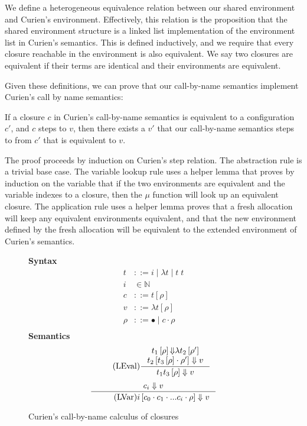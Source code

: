We define a heterogeneous equivalence relation between our shared environment
and Curien's environment. Effectively, this relation is the proposition that
the shared environment structure is a linked list implementation of the
environment list in Curien's semantics. This is defined inductively, and we
require that every closure reachable in the environment is also equivalent.  We
say two closures are equivalent if their terms are identical and their
environments are equivalent. 

Given these definitions, we can prove that our call-by-name semantics implement
Curien's call by name semantics: 

\begin{theorem}
If a closure $c$ in Curien's call-by-name semantics is equivalent to a
configuration $c'$, and $c$ steps to $v$, then there exists a $v'$ that our
call-by-name semantics steps to from $c'$ that is equivalent to $v$.
\end{theorem}
\begin{proofoutline}
The proof proceeds by induction on Curien's step relation. The abstraction rule
is a trivial base case. The variable lookup rule uses a helper lemma that proves
by induction on the variable that if the two environments are equivalent and the
variable indexes to a closure, then the $\mu$ function will look up an
equivalent closure. The application rule uses a helper lemma proves that a fresh
allocation will keep any equivalent environments equivalent, and that the new
environment defined by the fresh allocation will be equivalent to the extended
environment of Curien's semantics.
\end{proofoutline}

\begin{figure}
\textbf{Syntax}
\begin{align*}
\tag{Term} t &::= i \; | \; \lambda t \; | \; t \; t  \\
\tag{Variable} i &\in \mathbb{N}  \\
\tag{Closure} c &::= t \left[\rho\right] \\
\tag{Value} v &::= \lambda t \left[\rho\right] \\
\tag{Environment} \rho &::= \bullet \; | \; c \cdot \rho \\
\end{align*}
\textbf{Semantics}
\begin{align*}
\tag{LEval}\inference
{t_1\left[\rho\right] {\Downarrow} \lambda t_2\left[\rho'\right] \\ 
 t_2\left[t_3\left[\rho\right] \cdot \rho'\right] \Downarrow v}
{t_1 t_3\left[\rho\right] \Downarrow v } 
\end{align*}
\begin{align*}
\inference
{c_i \Downarrow v}
{\tag{LVar} i \left[c_0 \cdot c_1 \cdot ... c_i \cdot \rho\right] \Downarrow v}
\end{align*}
\caption{Curien's call-by-name calculus of closures}
\label{fig:curien}
\end{figure}

